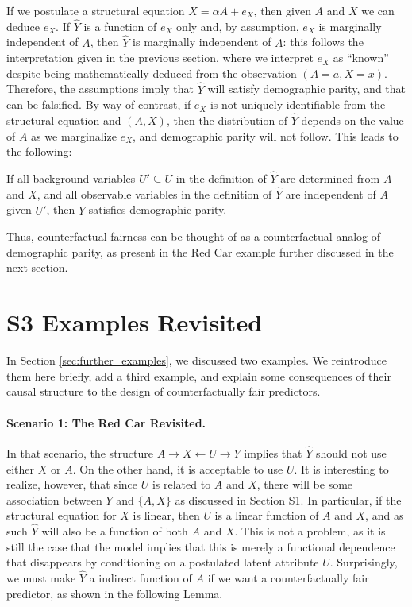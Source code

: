 If we postulate a structural equation $X = \alpha A + e_X$, then given
$A$ and $X$ we can deduce $e_X$. If $\hat Y$ is a function of $e_X$
only and, by assumption, $e_X$ is marginally independent of $A$, then
$\hat Y$ is marginally independent of $A$: this follows the
interpretation given in the previous section, where we interpret $e_X$
as ``known'' despite being mathematically deduced from the
observation $(A = a, X = x)$. Therefore, the assumptions imply that
$\hat Y$ will satisfy demographic parity, and that can be falsified.
By way of contrast, if $e_X$ is not uniquely identifiable from the
structural equation and $(A, X)$, then the distribution of $\hat Y$
depends on the value of $A$ as we marginalize $e_X$, and demographic
parity will not follow. This leads to the following:
%
\begin{lem}
If all background variables $U' \subseteq U$ in the definition of
$\hat Y$ are determined from $A$ and $X$,
and all observable variables in the definition of $\hat Y$ are
independent of $A$ given $U'$, then $\hat Y$ satisfies demographic
parity.
\end{lem}
Thus, counterfactual fairness can be thought of as a counterfactual
analog of demographic parity, as present in the Red Car example further discussed
in the next section.

\section*{S3 Examples Revisited}

In Section \ref{sec:further_examples}, we discussed two examples. We
reintroduce them here briefly, add a third example, and explain some
consequences of their causal structure to the design of
counterfactually fair predictors.

\paragraph{Scenario 1: The Red Car Revisited.}
In that scenario, the structure $A \rightarrow X \leftarrow U
\rightarrow Y$ implies that $\hat Y$ should not use either $X$ or
$A$. On the other hand, it is acceptable to use $U$.  It is
interesting to realize, however, that since $U$ is related to $A$ and
$X$, there will be some association between $Y$ and $\{A, X\}$ as
discussed in Section S1. In particular, if the structural equation for
$X$ is linear, then $U$ is a linear function of $A$ and $X$, and as
such $\hat Y$ will also be a function of both $A$ and $X$. This is not
a problem, as it is still the case that the model implies that this is
merely a functional dependence that disappears by conditioning on a
postulated latent attribute $U$. Surprisingly, we must make $\hat Y$ a
indirect function of $A$ if we want a counterfactually fair predictor,
as shown in the following Lemma.

